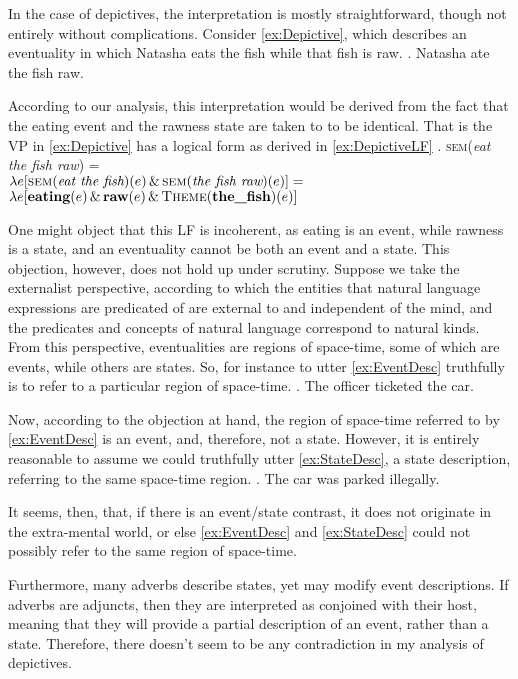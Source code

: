 \documentclass[MilwayThesis]{subfiles}
\begin{document}
In the case of depictives, the interpretation is mostly straightforward, though not entirely without complications.
Consider \cref{ex:Depictive}, which describes an eventuality in which Natasha eats the fish while that fish is raw.
\ex. Natasha ate the fish raw.\label{ex:Depictive}

According to our analysis, this interpretation would be derived from the fact that the eating event and the rawness state are taken to to be identical.
That is the VP in \cref{ex:Depictive} has a logical form  as derived in \cref{ex:DepictiveLF}
\ex. \textsc{sem}(\textit{eat the fish raw}) =\\
$\lambda e [\textsc{sem}(\textit{eat the fish})(e) \, \&\, \textsc{sem}(\textit{the fish raw})(e)] =$\\
$\lambda e [\textbf{eating}(e)\, \&\, \textbf{raw}(e)\, \&\, \textsc{Theme}(\textbf{the\_fish})(e)]$\label{ex:DepictiveLF}

One might object that this LF is incoherent, as eating is an event, while rawness is a state, and an eventuality cannot be both an event and a state.
This objection, however, does not hold up under scrutiny.
Suppose we take the externalist perspective, according to which the entities that natural language expressions are predicated of are external to and independent of the mind, and the predicates and concepts of natural language correspond to natural kinds.
From this perspective, eventualities are regions of space-time, some of which are events, while others are states.
So, for instance to utter \cref{ex:EventDesc} truthfully is to refer to a particular region of space-time.
\ex.\label{ex:EventDesc} The officer ticketed the car.

Now, according to the objection at hand, the region of space-time referred to by \cref{ex:EventDesc} is an event, and, therefore, not a state.
However, it is entirely reasonable to assume we could truthfully utter \cref{ex:StateDesc}, a state description, referring to the same space-time region.
\ex.\label{ex:StateDesc} The car was parked illegally.

It seems, then, that, if there is an event/state contrast, it does not originate in the extra-mental world, or else \cref{ex:EventDesc} and \cref{ex:StateDesc} could not possibly refer to the same region of space-time.

Furthermore, many adverbs describe states, yet may modify event descriptions.
If adverbs are adjuncts, then they are interpreted as conjoined with their host, meaning that they will provide a partial description of an event, rather than a state.
Therefore, there doesn't seem to be any contradiction in my analysis of depictives.
\end{document}
